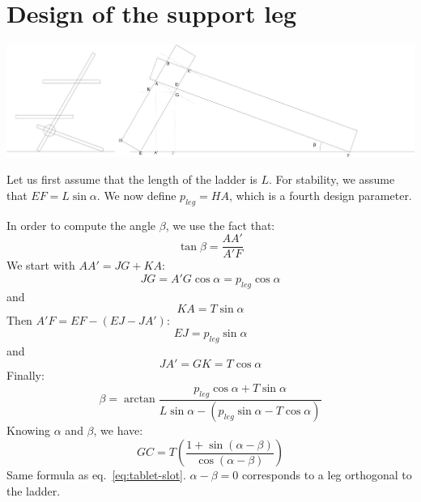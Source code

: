 \documentclass{article}
\begin{document}
\section{Design of the support leg}
\begin{center}
    \includegraphics[width=0.99\columnwidth]{slot2.pdf}
\end{center}
Let us first assume that the length of the ladder is $L$. For stability, we assume that $EF = L \sin\alpha$. We now define $p_{leg} = HA$, which is a fourth design parameter.

In order to compute the angle $\beta$, we use the fact that:
$$
\tan \beta = \frac{AA'}{A'F}
$$
We start with $AA' = JG + KA$:
$$
JG = A'G \cos \alpha = p_{leg} \cos \alpha
$$
and 
$$
KA = T \sin \alpha
$$
Then $A'F = EF - (EJ - JA')$:
$$
EJ=p_{leg} \sin \alpha
$$
and 
$$
JA' = GK = T \cos\alpha
$$
Finally:
$$
\beta = \arctan \frac{p_{leg} \cos \alpha + T \sin \alpha}{L\sin\alpha - (p_{leg} \sin \alpha - T \cos \alpha)}
$$
Knowing $\alpha$ and $\beta$, we have:
\begin{equation}
    \label{eq:leg-slot}
    GC =  T \left(\frac{1 + \sin\left(\alpha-\beta\right)}{\cos\left(\alpha-\beta\right)}\right)
\end{equation}
Same formula as eq.~\ref{eq:tablet-slot}. $\alpha-\beta=0$ corresponds to a leg orthogonal to the ladder. 
\end{document}
